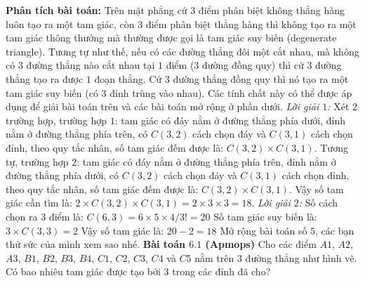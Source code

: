 \begin{multicols}{2}
\begin{figure}[H]
			\vspace*{-5pt}
		\end{figure}
	\vskip 0.1cm
	\textbf{\color{toancuabi}Phân tích bài toán:}
	\vskip 0.1cm
	Trên mặt phẳng cứ $3$ điểm phân biệt không thẳng hàng luôn tạo ra một tam giác, còn $3$ điểm phân biệt thẳng hàng thì không tạo ra một tam giác thông thưởng mà thường được gọi là tam giác suy biến (degenerate triangle). Tương tự như thế, nếu có các đường thẳng đôi một cắt nhau, mà không có $3$ đường thẳng nào cắt nhau tại $1$ điểm ($3$ đường đồng quy) thì cứ $3$ đường thẳng tạo ra được $1$ đoạn thẳng. Cứ $3$ đường thẳng đồng quy thì nó tạo ra một tam giác suy biến (có $3$ đỉnh trùng vào nhau). Các tính chất này có thể được áp dụng để giải bài toán trên và các bài toán mở rộng ở phần dưới.
	\vskip 0.1cm
	\textit{Lời giải $1$:}
	\vskip 0.1cm
	Xét $2$ trường hợp, trường hợp $1$: tam giác có đáy nằm ở đường thẳng phía dưới, đỉnh nằm ở đường thẳng phía trên, có $C(3,2)$ cách chọn đáy và $C(3,1)$ cách chọn đỉnh, theo quy tắc nhân, số tam giác đếm được là: $C(3,2)\times C(3,1)$. Tương tự, trường hợp $2$: tam giác có đáy nằm ở đường thẳng phía trên, đỉnh nằm ở đường thẳng phía dưới, có $C(3,2)$ cách chọn đáy và $C(3,1)$ cách chọn đỉnh, theo quy tắc nhân, số tam giác đếm được là: $C(3,2)\times C(3,1)$.
	\vskip 0.1cm
	Vậy số tam giác cần tìm là: $2\times C(3,2)\times C(3,1) = 2\times3\times3=18$.
	\vskip 0.1cm
	\textit{Lời giải $2$:}
	\vskip 0.1cm
	Số cách chọn ra $3$ điểm là: $C(6,3)=6\times 5\times4/3!=20$
	\vskip 0.1cm
	Số tam giác suy biến là: $3\times C(3,3)=2$
	\vskip 0.1cm
	Vậy số tam giác là: $20-2=18$
	\vskip 0.1cm
	Mở rộng bài toán số $5$, các bạn thử sức của mình xem sao nhé.
	\vskip 0.1cm
		\textbf{\color{toancuabi}Bài toán $\pmb{6.1}$ (Apmops)}
		\vskip 0.1cm
		Cho các điểm $A1$, $A2$, $A3$, $B1$, $B2$, $B3$, $B4$, $C1$, $C2$, $C3$, $C4$ và $C5$ nằm trên $3$ đường thẳng như hình vẽ. Có bao nhiêu tam giác được tạo bởi $3$ trong các đỉnh đã cho?
		\begin{figure}[H]
			\centering
			\vspace*{5pt}
			\captionsetup{labelformat=empty, justification=centering}
			\begin{tikzpicture}[toancuabi, scale=0.9]

\end{tikzpicture}
\end{figure}
\end{multicols}
